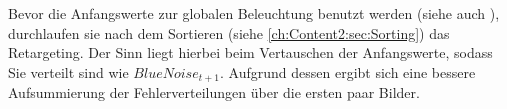 Bevor die Anfangswerte zur globalen Beleuchtung benutzt werden (siehe auch ), durchlaufen sie nach dem Sortieren 
(siehe \ref{ch:Content2:sec:Sorting}) das Retargeting. Der Sinn liegt hierbei beim Vertauschen der Anfangswerte, sodass Sie 
verteilt sind wie $BlueNoise_{t+1}$. Aufgrund dessen ergibt sich eine bessere Aufsummierung der
 Fehlerverteilungen über die ersten paar Bilder.
\par 

\begin{figure}[H]
    \begin{tcolorbox}[boxrule=4pt,sharp corners=downhill,title=Bedeutung des Retargeting]

\end{tcolorbox}
\end{figure}
